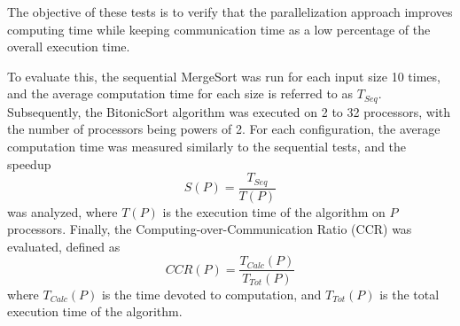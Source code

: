 \documentclass[article,12pt,conference]{ieeeconf} %
\begin{document}
The objective of these tests is to verify that the parallelization approach improves computing time while keeping communication time as a low percentage of the overall execution time. 
\par
To evaluate this, the sequential MergeSort was run for each input size 10 times, and the average computation time for each size is referred to as $T_{Seq}$.
Subsequently, the BitonicSort algorithm was executed on 2 to 32 processors, with the number of processors being powers of 2. For each configuration, the average computation time was measured similarly to the sequential tests, and the speedup$$S(P) = \frac{T_{Seq}}{T(P)}$$ was analyzed, where $T(P)$ is the execution time of the algorithm on $P$ processors.
Finally, the Computing-over-Communication Ratio (CCR) was evaluated, defined as $$CCR(P) = \frac{T_{Calc}(P)}{T_{Tot}(P)}$$ where $T_{Calc}(P)$ is the time devoted to computation, and $T_{Tot}(P)$ is the total execution time of the algorithm.

\addtolength{\textheight}{-12cm}   %


\printbibliography[nottype=online]
\end{document}
